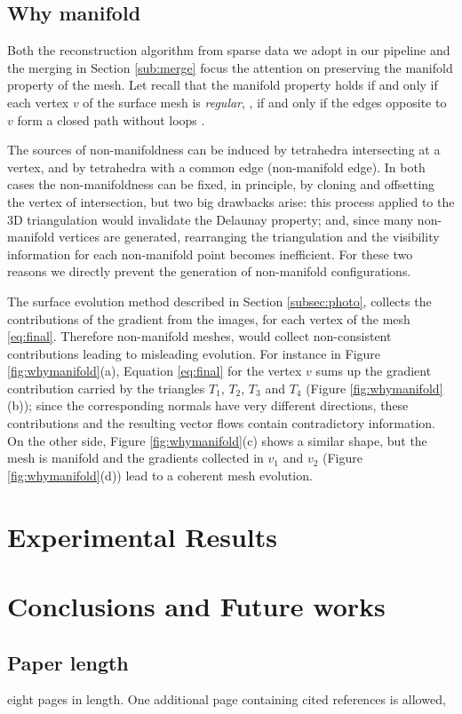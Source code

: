 \documentclass[times,10pt,twocolumn]{article}
\begin{document}
\subsection{Why manifold}
Both the reconstruction algorithm from sparse data we adopt in our pipeline and the merging in Section \ref{sub:merge} focus the attention on preserving the manifold property of the mesh.
Let recall that the manifold property holds if and only if each vertex $v$ of the surface mesh is \emph{regular}, \ie, if and only if the edges opposite to $v$ form a closed path without loops  \cite{litvinov_lhuillier_13}.

The sources of non-manifoldness can be induced by tetrahedra intersecting at a vertex, and by tetrahedra with a common edge (non-manifold edge). 
In both cases the non-manifoldness can be fixed, in principle, by cloning and offsetting the vertex of intersection, but two big drawbacks arise: this process applied to the 3D triangulation would invalidate the Delaunay property; and, since many non-manifold vertices are generated, rearranging the triangulation and the visibility information for each non-manifold point becomes inefficient. For these two reasons we directly prevent the generation of non-manifold configurations.

The surface evolution method described in Section \ref{subsec:photo}, collects the contributions of the gradient from the images, for each vertex of the mesh \eqref{eq:final}.
Therefore non-manifold meshes, would collect non-consistent contributions leading to misleading evolution. 
For instance in Figure \ref{fig:whymanifold}(a), Equation \eqref{eq:final} for the vertex $v$ sums up the gradient contribution carried by the triangles $T_1$, $T_2$, $T_3$ and $T_4$ (Figure \ref{fig:whymanifold}(b)); since the corresponding normals have very different directions, these contributions and the resulting vector flows contain contradictory information.
On the other side, Figure \ref{fig:whymanifold}(c) shows a similar shape, but the mesh is manifold and the gradients collected in $v_1$ and $v_2$ (Figure \ref{fig:whymanifold}(d)) lead to a coherent mesh evolution.





\section{Experimental Results}
\label{sec:exp}

\section{Conclusions and Future works}
\label{sec:concl}

\subsection{Paper length}
eight pages in length. One additional page containing cited references is allowed,

{\small


}
\end{document}
